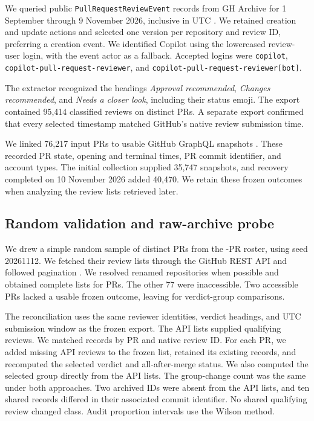 \documentclass[11pt,letterpaper]{article}
\begin{document}
We queried public \texttt{PullRequestReviewEvent} records from GH Archive
for 1 September through 9 November 2026, inclusive in UTC
\cite{gharchive}. We retained creation and update actions and selected
one version per repository and review ID, preferring a creation event.
We identified Copilot using the lowercased review-user login, with the
event actor as a fallback. Accepted logins were \texttt{copilot},
\texttt{copilot-pull-request-reviewer}, and
\texttt{copilot-pull-request-reviewer[bot]}.

The extractor recognized the headings \emph{Approval recommended},
\emph{Changes recommended}, and \emph{Needs a closer look}, including their
status emoji. The export contained 95,414 classified reviews on \FrameCount{}
distinct PRs. A separate export confirmed that every selected timestamp
matched GitHub's native review submission time.

We linked 76,217 input PRs to usable GitHub GraphQL snapshots
\cite{github_graphql}. These recorded PR state, opening and terminal
times, PR commit identifier, and account types. The initial collection supplied
35,747 snapshots, and recovery completed on 10 November 2026 added
40,470. We retain these frozen outcomes when analyzing the review lists
retrieved later.

\subsection{Random validation and raw-archive probe}

We drew a simple random sample of \AuditSample{} distinct PRs from the \FrameCount{}-PR
roster, using seed 20261112. We fetched their review lists through the
GitHub REST API and followed pagination \cite{github_reviews}. We resolved
renamed repositories when possible and obtained complete lists for
\AuditAccessible{} PRs. The other 77 were inaccessible. Two accessible PRs lacked
a usable frozen outcome, leaving \AuditLinked{} for verdict-group comparisons.

The reconciliation uses the same reviewer identities, verdict
headings, and UTC submission window as the frozen export. The API lists
supplied \AuditReviewCount{} qualifying reviews. We matched records by PR and native
review ID. For each PR, we added missing API reviews to the frozen list,
retained its existing records, and recomputed the selected verdict
and all-after-merge status. We also computed the selected group directly
from the API lists. The group-change count was the same under both
approaches. Two archived IDs were absent from the API lists, and ten
shared records differed in their associated commit identifier. No shared qualifying
review changed class. Audit proportion intervals use the Wilson method.
\end{document}
